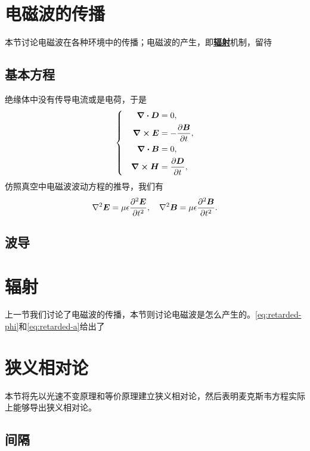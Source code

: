 \documentclass[UTF8, a4paper]{ctexart}
\newcommand*{\concept}[1]{\underline{\textbf{#1}}}
\newenvironment{bigcase}{\left\{\quad\begin{aligned}}{\end{aligned}\right.}
\begin{document}
\section{电磁波的传播}

本节讨论电磁波在各种环境中的传播；电磁波的产生，即\concept{辐射}机制，留待 %

\subsection{基本方程}

绝缘体中没有传导电流或是电荷，于是
\begin{equation}
    \begin{bigcase}
        \div{\vb*{D}} &= 0, \\
        \curl{\vb*{E}} &= - \pdv{\vb*{B}}{t}, \\
        \div{\vb*{B}} &= 0, \\
        \curl{\vb*{H}} &= \pdv{\vb*{D}}{t},
    \end{bigcase}
\end{equation}
仿照真空中电磁波波动方程的推导，我们有
\begin{equation}
    \laplacian{\vb*{E}} = \mu \epsilon \pdv[2]{\vb*{E}}{t}, \quad \laplacian{\vb*{B}} = \mu \epsilon \pdv[2]{\vb*{B}}{t}.
\end{equation}

\subsection{波导}

\section{辐射}

上一节我们讨论了电磁波的传播，本节则讨论电磁波是怎么产生的。\eqref{eq:retarded-phi}和\eqref{eq:retarded-a}给出了

\section{狭义相对论}

本节将先以光速不变原理和等价原理建立狭义相对论，然后表明麦克斯韦方程实际上能够导出狭义相对论。

\subsection{间隔}
\end{document}
